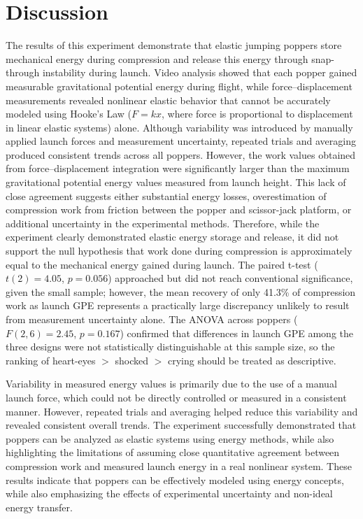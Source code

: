\documentclass[12pt]{article}
\begin{document}
\section{Discussion}
The results of this experiment demonstrate that elastic jumping poppers store mechanical energy during compression and release this energy through snap-through instability during launch. Video analysis showed that each popper gained measurable gravitational potential energy during flight, while force--displacement measurements revealed nonlinear elastic behavior that cannot be accurately modeled using Hooke's Law ($F = kx$, where force is proportional to displacement in linear elastic systems) alone. Although variability was introduced by manually applied launch forces and measurement uncertainty, repeated trials and averaging produced consistent trends across all poppers. However, the work values obtained from force--displacement integration were significantly larger than the maximum gravitational potential energy values measured from launch height. This lack of close agreement suggests either substantial energy losses, overestimation of compression work from friction between the popper and scissor-jack platform, or additional uncertainty in the experimental methods. Therefore, while the experiment clearly demonstrated elastic energy storage and release, it did not support the null hypothesis that work done during compression is approximately equal to the mechanical energy gained during launch. The paired t-test ($t(2) = 4.05$, $p = 0.056$) approached but did not reach conventional significance, given the small sample; however, the mean recovery of only 41.3\% of compression work as launch GPE represents a practically large discrepancy unlikely to result from measurement uncertainty alone. The ANOVA across poppers ($F(2, 6) = 2.45$, $p = 0.167$) confirmed that differences in launch GPE among the three designs were not statistically distinguishable at this sample size, so the ranking of heart-eyes $>$ shocked $>$ crying should be treated as descriptive.

Variability in measured energy values is primarily due to the use of a manual launch force, which could not be directly controlled or measured in a consistent manner. However, repeated trials and averaging helped reduce this variability and revealed consistent overall trends. The experiment successfully demonstrated that poppers can be analyzed as elastic systems using energy methods, while also highlighting the limitations of assuming close quantitative agreement between compression work and measured launch energy in a real nonlinear system. These results indicate that poppers can be effectively modeled using energy concepts, while also emphasizing the effects of experimental uncertainty and non-ideal energy transfer.
\end{document}
